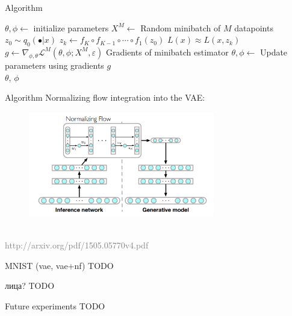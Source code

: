 \documentclass[unicode,11pt]{beamer}
\begin{document}
\begin{frame}[fragile]{Algorithm}
  \begin{algorithmic}
    \State $\theta, \phi \gets$ initialize parameters
    \Repeat
       \State $X^M \gets$ Random minibatch of $M$ datapoints
       \State $z_0 \sim q_0(\bullet|x)$
       \State $z_k \gets f_K \circ f_{K-1} \circ \cdots \circ f_1(z_0)$
       \State $L(x) \approx L(x, z_k)$
       \State $g \gets \nabla_{\phi, \theta} \mathcal{L}^M(\theta, \phi; X^M, \varepsilon) $ Gradients of minibatch estimator
       \State $\theta, \phi \gets$ Update parameters using gradients $g$
    \\
    \Return $\theta$, $\phi$
  \end{algorithmic}

\end{frame}

\begin{frame}[fragile]{Algorithm}
  Normalizing flow integration into the VAE:\\
  \begin{figure}[htbp]
    \includegraphics[height=130pt, keepaspectratio = true]{images/norFlow}
  \end{figure}
  ~\\
  \tiny \textcolor{gray}{http://arxiv.org/pdf/1505.05770v4.pdf}
\end{frame}

\begin{frame}[fragile]{MNIST (vae, vae+nf)}
  TODO
\end{frame}

\begin{frame}[fragile]{лица?}
  TODO
\end{frame}

\begin{frame}[fragile]{Future experiments}
  TODO
\end{frame}
\end{document}
